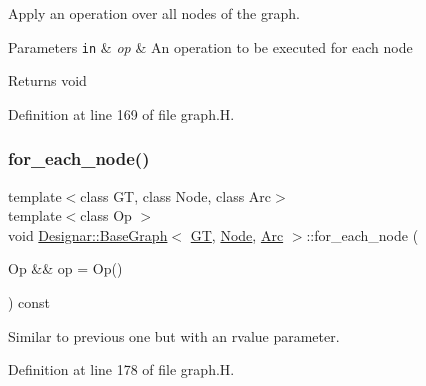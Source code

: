 Apply an operation over all nodes of the graph. 


\begin{DoxyParams}[1]{Parameters}
\mbox{\tt in}  & {\em op} & An operation to be executed for each node \\
\hline
\end{DoxyParams}
\begin{DoxyReturn}{Returns}
void 
\end{DoxyReturn}


Definition at line 169 of file graph.\+H.

\mbox{\label{class_designar_1_1_base_graph_aab8f765719514803f426b03939f519a1}} 
\subsubsection{\texorpdfstring{for\+\_\+each\+\_\+node()}{for\_each\_node()}\hspace{0.1cm}{\footnotesize\ttfamily [2/2]}}
{\footnotesize\ttfamily template$<$class GT, class Node, class Arc$>$ \\
template$<$class Op $>$ \\
void \hyperlink{class_designar_1_1_base_graph}{Designar\+::\+Base\+Graph}$<$ \hyperlink{demo-buildgraph_8_c_a3001c40d2c31ca87ed96cd7d1334a55e}{GT}, \hyperlink{namespace_designar_a5af326c65aa2bd26b26c410f2030d09e}{Node}, \hyperlink{namespace_designar_a3f55fb5513d62ff47cbc8f72b8e95d6f}{Arc} $>$\+::for\+\_\+each\+\_\+node (\begin{DoxyParamCaption}\item[{Op \&\&}]{op = {\ttfamily Op()} }\end{DoxyParamCaption}) const\hspace{0.3cm}{\ttfamily [inline]}}



Similar to previous one but with an rvalue parameter. 



Definition at line 178 of file graph.\+H.

\mbox{\label{class_designar_1_1_base_graph_a56b1ec4a0258d9f22542f33615bcdbea}} 
